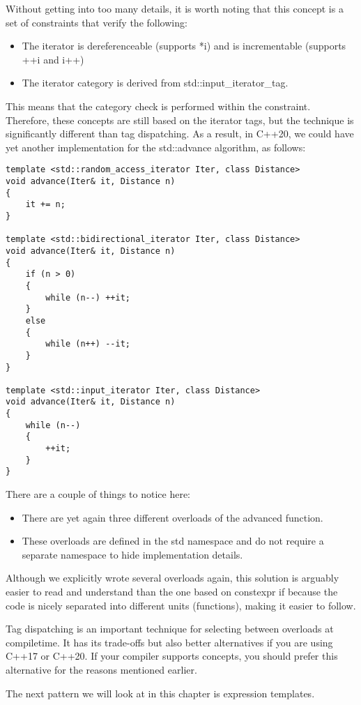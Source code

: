 Without getting into too many details, it is worth noting that this concept is a set of constraints that verify the following:

\begin{itemize}
\item
The iterator is dereferenceable (supports *i) and is incrementable (supports ++i and i++)

\item
The iterator category is derived from std::input\_iterator\_tag.
\end{itemize}

This means that the category check is performed within the constraint. Therefore, these concepts are still based on the iterator tags, but the technique is significantly different than tag dispatching. As a result, in C++20, we could have yet another implementation for the std::advance algorithm, as follows:

\begin{lstlisting}[style=styleCXX]
template <std::random_access_iterator Iter, class Distance>
void advance(Iter& it, Distance n)
{
	it += n;
}

template <std::bidirectional_iterator Iter, class Distance>
void advance(Iter& it, Distance n)
{
	if (n > 0)
	{
		while (n--) ++it;
	}
	else
	{
		while (n++) --it;
	}
}

template <std::input_iterator Iter, class Distance>
void advance(Iter& it, Distance n)
{
	while (n--)
	{
		++it;
	}
}
\end{lstlisting}

There are a couple of things to notice here:

\begin{itemize}
\item
There are yet again three different overloads of the advanced function.

\item
These overloads are defined in the std namespace and do not require a separate namespace to hide implementation details.
\end{itemize}

Although we explicitly wrote several overloads again, this solution is arguably easier to read and understand than the one based on constexpr if because the code is nicely separated into different units (functions), making it easier to follow.

Tag dispatching is an important technique for selecting between overloads at compiletime. It has its trade-offs but also better alternatives if you are using C++17 or C++20. If your compiler supports concepts, you should prefer this alternative for the reasons mentioned earlier.

The next pattern we will look at in this chapter is expression templates.


